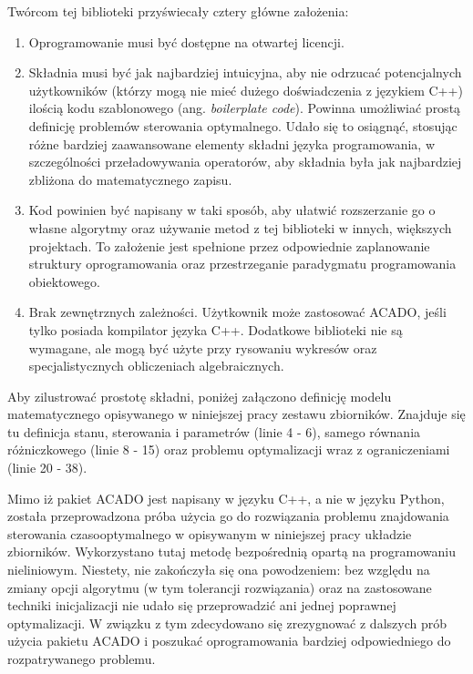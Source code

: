 Twórcom tej biblioteki przyświecały cztery główne założenia:
\begin{enumerate}
    \item Oprogramowanie musi być dostępne na otwartej licencji.
    \item Składnia musi być jak najbardziej intuicyjna, aby nie odrzucać potencjalnych użytkowników (którzy mogą nie mieć dużego doświadczenia z językiem C++) ilością kodu szablonowego (ang. \emph{boilerplate code}). Powinna umożliwiać prostą definicję problemów sterowania optymalnego. Udało się to osiągnąć, stosując różne bardziej zaawansowane elementy składni języka programowania, w szczególności przeładowywania operatorów, aby składnia była jak najbardziej zbliżona do matematycznego zapisu.
    \item Kod powinien być napisany w taki sposób, aby ułatwić rozszerzanie go o własne algorytmy oraz używanie metod z tej biblioteki w innych, większych projektach. To założenie jest spełnione przez odpowiednie zaplanowanie struktury oprogramowania oraz przestrzeganie paradygmatu programowania obiektowego.
    \item Brak zewnętrznych zależności. Użytkownik może zastosować ACADO, jeśli tylko posiada kompilator języka C++. Dodatkowe biblioteki nie są wymagane, ale mogą być użyte przy rysowaniu wykresów oraz specjalistycznych obliczeniach algebraicznych.
\end{enumerate}

Aby zilustrować prostotę składni, poniżej załączono definicję modelu matematycznego opisywanego w niniejszej pracy zestawu zbiorników. Znajduje się tu definicja stanu, sterowania i parametrów (linie 4 - 6), samego równania różniczkowego (linie 8 - 15) oraz problemu optymalizacji wraz z ograniczeniami (linie 20 - 38).



Mimo iż pakiet ACADO jest napisany w języku C++, a nie w języku Python, została przeprowadzona próba użycia go do rozwiązania problemu znajdowania sterowania czasooptymalnego w opisywanym w niniejszej pracy układzie zbiorników. Wykorzystano tutaj metodę bezpośrednią opartą na programowaniu nieliniowym. Niestety, nie zakończyła się ona powodzeniem: bez względu na zmiany opcji algorytmu (w tym tolerancji rozwiązania) oraz na zastosowane techniki inicjalizacji nie udało się przeprowadzić ani jednej poprawnej optymalizacji. W związku z tym zdecydowano się zrezygnować z dalszych prób użycia pakietu ACADO i poszukać oprogramowania bardziej odpowiedniego do rozpatrywanego problemu.

